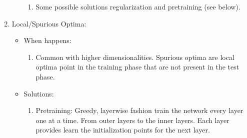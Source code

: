 \documentclass{article}
\begin{document}
\begin{enumerate}
\begin{itemize}
\begin{enumerate}
\item  Some possible solutions regularization and pretraining (see below).
\end{enumerate}
\end{itemize}
\item Local/Spurious Optima:
\begin{itemize}
\item When happens:
\begin{enumerate}
\item Common with higher dimensionalities. Spurious optima are local optima point in the training phase that are not present in the test phase.
\end{enumerate}
\item Solutions:
\begin{enumerate}
\item Pretraining: Greedy, layerwise fashion train the network every layer one at a time. From outer layers to the inner layers. Each layer provides learn the initialization points for the next layer.
\end{enumerate}
\end{itemize}
\end{enumerate}








\end{document}
